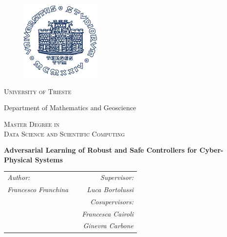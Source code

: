 \begin{titlepage}
\begin{adjustwidth}{-1cm}{-1cm}

\begin{figure}
\begin{center}
\includegraphics[width=4cm,height=4cm]{img/0_logo_units.png}
\vspace{0.2cm}
\end{center}
\end{figure}

\begin{center}
\textsc{\LARGE University of Trieste } \\
\vspace{0.1cm}

{\large Department of Mathematics and Geoscience}\\
\vspace{1cm}

\textsc{\Large Master Degree in \\Data Science and Scientific Computing}\\

\vspace{2cm}

\begin{large}
\begin{center}
\textbf{\Large Adversarial Learning of Robust and Safe Controllers for Cyber-Physical Systems}
\end{center}
\end{large}

\vspace{2cm}

\begin{normalsize}
\begin{tabular}{l c r}
{\it Author: } & &{\it Supervisor:} \\
\vspace{0.5cm}
{\it Francesco Franchina} & \hspace{5cm} &{\it Luca Bortolussi} \\
& \hspace{3cm} & {\it Cosupervisors:} \\
& \hspace{3cm} & {\it Francesca Cairoli} \\
& \hspace{3cm} & {\it Ginevra Carbone} \\


\end{tabular}
\end{normalsize}
\end{center}
\end{adjustwidth}
\end{titlepage}
